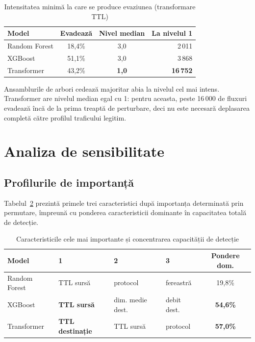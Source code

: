 \begin{table}[!ht]
    \caption{Intensitatea minimă la care se produce evaziunea (transformare TTL)}
    \centering
    \begin{tabular}{|l|c|c|r|}
        \hline
        \textbf{Model} & \textbf{Evadează} & \textbf{Nivel median} & \textbf{La nivelul 1} \\
        \hline
        Random Forest & 18,4\% & 3,0 & 2\,011 \\
        \hline
        XGBoost & 51,1\% & 3,0 & 3\,868 \\
        \hline
        Transformer & 43,2\% & \textbf{1,0} & \textbf{16\,752} \\
        \hline
    \end{tabular}
    \label{tab:intensitate}
\end{table}

Ansamblurile de arbori cedează majoritar abia la nivelul cel mai intens. Transformer are nivelul median egal cu 1: pentru aceasta, peste 16\,000 de fluxuri evadează încă de la prima treaptă de perturbare, deci nu este necesară deplasarea completă către profilul traficului legitim.

\section{Analiza de sensibilitate}\label{sec:rezultate-o4}

\subsection{Profilurile de importanță}\label{subsec:profiluri}

Tabelul~\ref{tab:importanta} prezintă primele trei caracteristici după importanța determinată prin permutare, împreună cu ponderea caracteristicii dominante în capacitatea totală de detecție.

\begin{table}[H]
    \caption{Caracteristicile cele mai importante și concentrarea capacității de detecție}
    \centering
    \begin{tabular}{|l|l|l|l|c|}
        \hline
        \textbf{Model} & \textbf{1} & \textbf{2} & \textbf{3} & \textbf{Pondere dom.} \\
        \hline
        Random Forest & TTL sursă & protocol & fereastră & 19,8\% \\
        \hline
        XGBoost & \textbf{TTL sursă} & dim. medie dest. & debit dest. & \textbf{54,6\%} \\
        \hline
        Transformer & \textbf{TTL destinație} & TTL sursă & protocol & \textbf{57,0\%} \\
        \hline
    \end{tabular}
    \label{tab:importanta}
\end{table}

